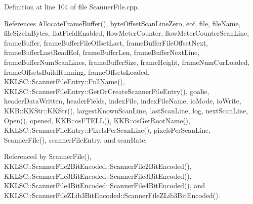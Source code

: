 Definition at line 104 of file Scanner\+File.\+cpp.



References Allocate\+Frame\+Buffer(), byte\+Offset\+Scan\+Line\+Zero, eof, file, file\+Name, file\+Size\+In\+Bytes, flat\+Field\+Enabled, flow\+Meter\+Counter, flow\+Meter\+Counter\+Scan\+Line, frame\+Buffer, frame\+Buffer\+File\+Offset\+Last, frame\+Buffer\+File\+Offset\+Next, frame\+Buffer\+Last\+Read\+Eof, frame\+Buffer\+Len, frame\+Buffer\+Next\+Line, frame\+Buffer\+Num\+Scan\+Lines, frame\+Buffer\+Size, frame\+Height, frame\+Num\+Cur\+Loaded, frame\+Offsets\+Build\+Running, frame\+Offsets\+Loaded, K\+K\+L\+S\+C\+::\+Scanner\+File\+Entry\+::\+Full\+Name(), K\+K\+L\+S\+C\+::\+Scanner\+File\+Entry\+::\+Get\+Or\+Create\+Scanner\+File\+Entry(), goalie, header\+Data\+Written, header\+Fields, index\+File, index\+File\+Name, io\+Mode, io\+Write, K\+K\+B\+::\+K\+K\+Str\+::\+K\+K\+Str(), largest\+Known\+Scan\+Line, last\+Scan\+Line, log, next\+Scan\+Line, Open(), opened, K\+K\+B\+::os\+F\+T\+E\+L\+L(), K\+K\+B\+::os\+Get\+Root\+Name(), K\+K\+L\+S\+C\+::\+Scanner\+File\+Entry\+::\+Pixels\+Per\+Scan\+Line(), pixels\+Per\+Scan\+Line, Scanner\+File(), scanner\+File\+Entry, and scan\+Rate.



Referenced by Scanner\+File(), K\+K\+L\+S\+C\+::\+Scanner\+File2\+Bit\+Encoded\+::\+Scanner\+File2\+Bit\+Encoded(), K\+K\+L\+S\+C\+::\+Scanner\+File3\+Bit\+Encoded\+::\+Scanner\+File3\+Bit\+Encoded(), K\+K\+L\+S\+C\+::\+Scanner\+File4\+Bit\+Encoded\+::\+Scanner\+File4\+Bit\+Encoded(), and K\+K\+L\+S\+C\+::\+Scanner\+File\+Z\+Lib3\+Bit\+Encoded\+::\+Scanner\+File\+Z\+Lib3\+Bit\+Encoded().


